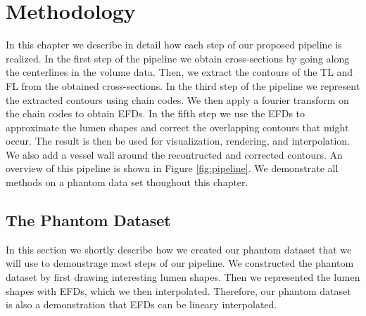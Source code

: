 \documentclass[thesis.tex]{subfiles}
\begin{document}
\chapter{Methodology}\label{chap:basics}

In this chapter we describe in detail how each step of our proposed pipeline is realized. In the first step of the pipeline we obtain cross-sections by going along the centerlines in the volume data. Then, we extract the contours of the TL and FL from the obtained cross-sections. In the third step of the pipeline we represent the extracted contours using chain codes. We then apply a fourier transform on the chain codes to obtain EFDs. In the fifth step we use the EFDs to approximate the lumen shapes and correct the overlapping contours that might occur. The result is then be used for visualization, rendering, and interpolation. We also add a vessel wall around the recontructed and corrected contours. An overview of this pipeline is shown in Figure \ref{fig:pipeline}. We demonstrate all methods on a phantom data set thoughout this chapter. 

\begin{center}
\end{center}

\section{The Phantom Dataset}
In this section we shortly describe how we created our phantom dataset that we will use to demonstrage most steps of our pipeline. We constructed the phantom dataset by first drawing interesting lumen shapes. Then we represented the lumen shapes with EFDs, which we then interpolated. Therefore, our phantom dataset is also a demonstration that EFDs can be lineary interpolated.
\end{document}
